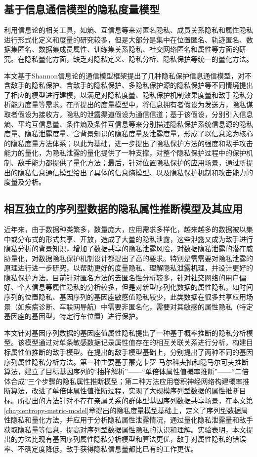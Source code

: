 \subsection{基于信息通信模型的隐私度量模型}
利用信息论的相关工具，如熵、互信息等来对匿名隐私、成员关系隐私和属性隐私进行形式化定义和度量的研究较多，但是大部分是集中在位置匿名、轨迹匿名、数据集匿名、数据集成员属性、训练集关系隐私、社交网络匿名和属性等方面的研究。在隐私量化方面，缺乏对隐私定义、隐私分析、隐私保护等统一的量化方法。

本文基于Shannon信息论的通信模型框架提出了几种隐私保护信息通信模型，对不含敌手的隐私保护、含敌手的隐私保护、多隐私保护源的隐私保护等不同情境提出了相应的模型进行建模，以满足对隐私度量、隐私保护机制效果度量和敌手隐私分析能力度量等需求。在所提出的度量模型中，将信息拥有者假设为发送方，隐私谋取者假设为接收方，隐私的泄露渠道假设为通信信道；基于该假设，分别引入信息熵、平均互信息量、条件熵及条件互信息等来分别描述隐私保护系统信息源的隐私度量、隐私泄露度量、含背景知识的隐私度量及泄露度量，形成了以信息论为核心的隐私度量方法体系；以此为基础，进一步提出了隐私保护方法的强度和敌手攻击能力的量化，为隐私泄露的量化提供了一种支撑，对整个隐私保护过程中的保护机制、敌手能力都提供了量化方法；最后，针对位置隐私保护的应用场景，通过所提出的隐私信息通信模型给出了具体的信息熵模型、以及隐私保护机制和攻击能力的度量及分析。
\subsection{相互独立的序列型数据的隐私属性推断模型及其应用}
近年来，由于数据种类繁多，数量庞大，应用需求多样化，越来越多的数据被以集中或分布式的形式共享、开放，造成了大量的隐私泄露，这些泄露又成为敌手进行隐私分析的背景知识，增加了数据共享的隐私泄露风险，对数据隐私泄露的潜在威胁量化，对数据隐私保护机制设计都提出了高的要求。特别是需需要对隐私泄露的原理进行进一步研究，以帮助更好的度量隐私、理解隐私泄露机理，并设计更好的隐私保护方法。目前针对匿名方法的去匿名性分析较多，针对社交网络的用户偏好、个人信息等属性隐私的分析较多，但是对新型序列化数据的属性隐私，如时间序列的位置隐私、基因序列的基因座敏感值隐私较少，此类数据在很多共享应用场景（如疾病诊断、车联网导航）中需要非匿名化，需要对其敏感的属性隐私（特定基因座的基因型，特定行车位置）进行保护。

本文针对基因序列数据的基因座值属性隐私提出了一种基于概率推断的隐私分析模型。该模型通过对单条敏感数据记录属性值存在的相互关联关系进行分析，构建目标属性值推断的敌手模型。在提出的敌手模型基础上，分别提出了两种不同的基因序列属性隐私分析方法。第一种主要基于蒙克卡罗-马尔科夫抽和隐马尔可夫推断算法，建立了目标基因序列的“抽样解析”——“单倍体属性值概率推断”——“二倍体合成”三个步骤的隐私属性推断模型；第二种方法应用卷积神经网络构建概率推断算法，改进了单倍体属性值推断过程，实现了大规模序列型数据的属性推断目标。所提出的方法针对不存在亲属关系的群体型基因序列数据共享场景，在本文第\ref{chap:entropy-metric-model}章提出的隐私度量模型基础上，定义了序列型数据属性隐私和量化方法，并应用于分析隐私属性泄露情况，通过量化隐私泄露量和敌手获取隐私量等信息，提高对序列型数据属性隐私的认识和理解。实验表明，本文提出的方法比现有基因序列属性隐私分析模型和算法更优，敌手对属性隐私的错误率、不确定度降低，敌手获得隐私信息量都比已有的工作更优。
